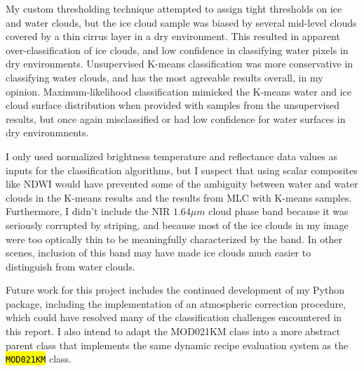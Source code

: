 \documentclass[12pt]{article}
\newcommand{\hltexttt}[1]{\texttt{\hl{#1}}}
\begin{document}
My custom thresholding technique attempted to assign tight thresholds on ice and water clouds, but the ice cloud sample was biased by several mid-level clouds covered by a thin cirrus layer in a dry environment. This resulted in apparent over-classification of ice clouds, and low confidence in classifying water pixels in dry environments. Unsupervised K-means classification was more conservative in classifying water clouds, and has the most agreeable results overall, in my opinion. Maximum-likelihood classification mimicked the K-means water and ice cloud surface distribution when provided with samples from the unsupervised results, but once again misclassified or had low confidence for water surfaces in dry environmnents.

I only used normalized brightness temperature and reflectance data values as inputs for the classification algorithms, but I suspect that using scalar composites like NDWI would have prevented some of the ambiguity between water and water clouds in the K-means results and the results from MLC with K-means samples. Furthermore, I didn't include the NIR $1.64\mu m$ cloud phase band because it was seriously corrupted by striping, and because most of the ice clouds in my image were too optically thin to be meaningfully characterized by the band. In other scenes, inclusion of this band may have made ice clouds much easier to distinguish from water clouds.

Future work for this project includes the continued development of my Python package, including the implementation of an atmospheric correction procedure, which could have resolved many of the classification challenges encountered in this report. I also intend to adapt the MOD021KM class into a more abstract parent class that implements the same dynamic recipe evaluation system as the \hltexttt{MOD021KM} class.

\clearpage
\end{document}
